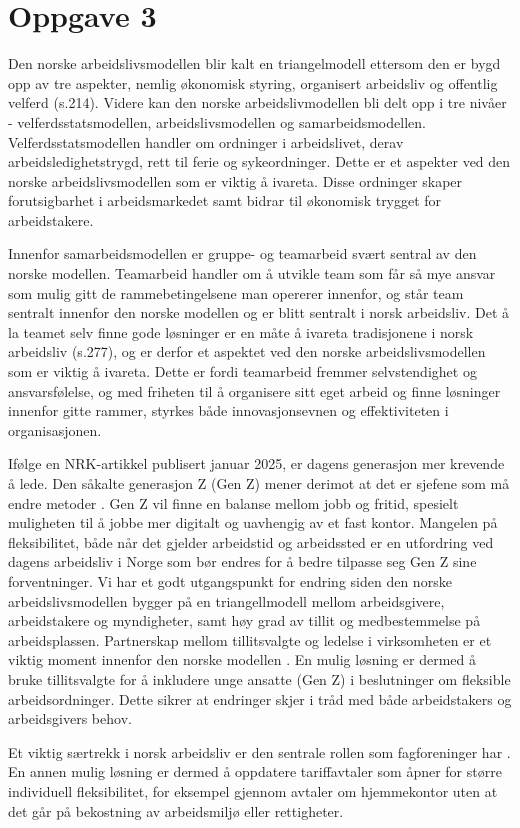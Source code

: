 \section{Oppgave 3}
Den norske arbeidslivsmodellen blir kalt en triangelmodell ettersom den er bygd opp av tre aspekter, nemlig økonomisk styring, organisert arbeidsliv og offentlig velferd \parencite{Teknologiledelse} (s.214). 
Videre kan den norske arbeidslivmodellen bli delt opp i tre nivåer - velferdsstatsmodellen, arbeidslivsmodellen og samarbeidsmodellen. 
Velferdsstatsmodellen handler om ordninger i arbeidslivet, derav arbeidsledighetstrygd, rett til ferie og sykeordninger. 
Dette er et aspekter ved den norske arbeidslivsmodellen som er viktig å ivareta. Disse ordninger skaper forutsigbarhet i arbeidsmarkedet samt bidrar til økonomisk trygget for arbeidstakere.
 
Innenfor samarbeidsmodellen er gruppe- og teamarbeid svært sentral av den norske modellen. 
Teamarbeid handler om å utvikle team som får så mye ansvar som mulig gitt de rammebetingelsene man opererer innenfor, og står team sentralt innenfor den norske modellen og er blitt sentralt i norsk arbeidsliv. 
Det å la teamet selv finne gode løsninger er en måte å ivareta tradisjonene i norsk arbeidsliv \parencite{Teknologiledelse} (s.277), og er derfor et aspektet ved den norske arbeidslivsmodellen som er viktig å ivareta. 
Dette er fordi teamarbeid fremmer selvstendighet og ansvarsfølelse, og med friheten til å organisere sitt eget arbeid og finne løsninger innenfor gitte rammer, styrkes både innovasjonsevnen og effektiviteten i organisasjonen.
 
Ifølge en NRK-artikkel publisert januar 2025, er dagens generasjon mer krevende å lede. Den såkalte generasjon Z (Gen Z) mener derimot at det er sjefene som må endre metoder \parencite{NRK}. Gen Z vil finne en balanse mellom jobb og fritid, spesielt muligheten til å jobbe mer digitalt og uavhengig av et fast kontor.  Mangelen på fleksibilitet, både når det gjelder arbeidstid og arbeidssted er en utfordring ved dagens arbeidsliv i Norge som bør endres for å bedre tilpasse seg Gen Z sine forventninger. Vi har et godt utgangspunkt for endring siden den norske arbeidslivsmodellen bygger på en triangellmodell mellom arbeidsgivere, arbeidstakere og myndigheter, samt høy grad av tillit og medbestemmelse på arbeidsplassen. Partnerskap mellom tillitsvalgte og ledelse i virksomheten er et viktig moment innenfor den norske modellen \parencite[229]{Teknologiledelse}. 
En mulig løsning er dermed å bruke tillitsvalgte for å inkludere unge ansatte (Gen Z) i beslutninger om fleksible arbeidsordninger. Dette sikrer at endringer skjer i tråd med både arbeidstakers og arbeidsgivers behov.
 
 
Et viktig særtrekk i norsk arbeidsliv er den sentrale rollen som fagforeninger har \parencite[214]{Teknologiledelse}. En annen mulig løsning er dermed å oppdatere tariffavtaler som åpner for større individuell fleksibilitet, for eksempel gjennom avtaler om hjemmekontor uten at det går på bekostning av arbeidsmiljø eller rettigheter. 